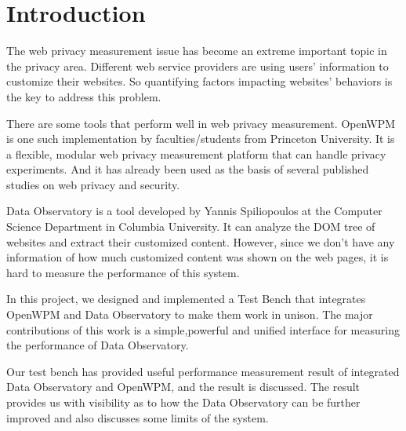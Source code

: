 \documentclass[fleqn,12pt]{SelfArx} %
\affiliation{\textsuperscript{1}\textit{Electrical Engineering,Columbia University}} %
\affiliation{\textsuperscript{2}\textit{Electrical Engineering, Columbia University}} %
\begin{document}
\flushbottom %

\maketitle %

\tableofcontents %

\thispagestyle{empty} %


\section*{Introduction} %

The web privacy measurement issue has become an extreme important topic in the privacy area. Different web service providers are using users’ information to customize their websites. So quantifying factors impacting websites’ behaviors is the key to address this problem.\par
There are some tools that perform well in web privacy measurement. OpenWPM\cite{openwpm} is one such implementation by faculties/students from Princeton University. It is a flexible, modular web privacy measurement platform that can handle privacy experiments. And it has already been used as the basis of several published studies on web privacy and security. \par
Data Observatory is a tool developed by Yannis Spiliopoulos at the Computer Science Department in Columbia University. It can analyze the DOM tree of websites and extract their customized content. However, since we don’t have any information of how much customized content was shown on the web pages, it is hard to measure the performance of this system.\par
In this project, we designed and implemented a Test Bench that integrates OpenWPM and Data Observatory to make them work in unison. The major contributions of this work is a simple,powerful and unified interface for measuring the performance of Data Observatory.\par
Our test bench has provided useful performance measurement result of integrated Data Observatory and OpenWPM, and the result is discussed. The result provides us with visibility as to how the Data Observatory can be further improved and also discusses some limits of the system.
\end{document}
